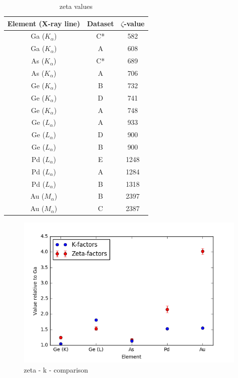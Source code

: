 \begin{table}[h!]
	\caption{zeta values}
	\begin{center}
	\begin{tabular}{ccc}

	Element (X-ray line) & Dataset & $\zeta$-value \\ 
	\midrule
	\hline
	Ga ($K_\alpha$)  & C* & 582\\
	Ga ($K_\alpha$)  & A  & 608\\ \hline
	As ($K_\alpha$)  & C* & 689\\
	As ($K_\alpha$)  & A  & 706\\ \hline
	Ge ($K_\alpha$)  & B  & 732\\
	Ge ($K_\alpha$)  & D  & 741\\
	Ge ($K_\alpha$)  & A  & 748\\ \hline
	Ge ($L_\alpha$)  & A  & 933\\
	Ge ($L_\alpha$)  & D  & 900\\
	Ge ($L_\alpha$)  & B  & 900\\ \hline
	Pd ($L_\alpha$)  & E  & 1248\\
	Pd ($L_\alpha$)  & A  & 1284\\
	Pd ($L_\alpha$)  & B  & 1318\\ \hline
	Au ($M_\alpha$) & B & 2397\\
	Au ($M_\alpha$) & C & 2387\\
	\hline
	\end{tabular}
	\end{center}
	\label{tab:non-heated zeta-values}
\end{table}

\begin{figure}[h]
	\centering
	\includegraphics[width=0.7\linewidth]{fig/other/zeta-k-plot}
	\caption{zeta - k - comparison}
	\label{fig:zeta-k-comparison}
\end{figure}

